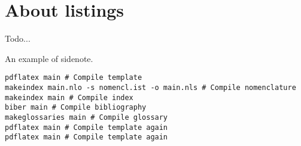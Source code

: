 
\section{About listings}

Todo...

An example of sidenote.



\begin{lstlisting}[style=kaolstplain,linewidth=1.5\textwidth]
pdflatex main # Compile template
makeindex main.nlo -s nomencl.ist -o main.nls # Compile nomenclature
makeindex main # Compile index
biber main # Compile bibliography
makeglossaries main # Compile glossary
pdflatex main # Compile template again
pdflatex main # Compile template again
\end{lstlisting}


